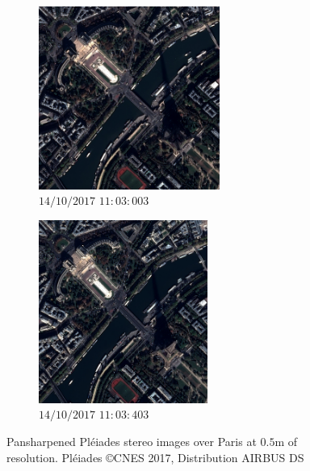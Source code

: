 \begin{figure}
    \centering
    \begin{subfigure}[t]{0.5\linewidth}
        \centering
        \includegraphics[height=6cm]{Images/Chap_1/Paris_003.jpeg}
        \caption{$14/10/2017$ $11:03:003$}
        \label{fig:Pleiade_over_Paris_a}
    \end{subfigure}\hfill
    \begin{subfigure}[t]{0.5\linewidth}
        \centering
        \includegraphics[height=6cm]{Images/Chap_1/Paris_403.jpeg}
        \caption{$14/10/2017$ $11:03:403$}
        \label{fig:Pleiade_over_Paris_b}
    \end{subfigure}
    \caption{Pansharpened Pléiades stereo images over Paris at $0.5$m of resolution. Pléiades \copyright CNES 2017, Distribution AIRBUS DS}
    \label{fig:Pleiade_over_Paris}
\end{figure}

